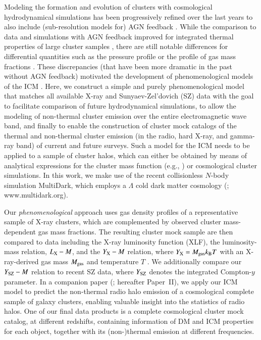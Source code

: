 \documentclass[useAMS,usenatbib]{mn2e}
\begin{document}
{  Modeling the formation and evolution of clusters with cosmological
  hydrodynamical simulations has been progressively refined over the last years
  to also include (sub-resolution models for) AGN feedback
  \citep[e.g.,][]{2007MNRAS.380..877S, 2008MNRAS.387.1403S, 2008ApJ...687L..53P,
    2012MNRAS.420.2662D, 2012MNRAS.424..190G, 2013MNRAS.428.2366V}. While the
  comparison to data and simulations with AGN feedback improved for integrated
  thermal properties of large cluster samples
  \citep{2012ApJ...758...74B,2012ApJ...758...75B}, there are still notable
  differences for differential quantities such as the pressure profile
  \citep{2013A&A...550A.131P} or the profile of gas mass fractions
  \citep{2012arXiv1209.4082B}. These discrepancies (that have been more dramatic
  in the past without AGN feedback) motivated the development of
  phenomenological models of the ICM \citep[e.g.,][]{2005ApJ...634..964O,
    2012MNRAS.422..686C}. Here, we construct a simple and purely
  phenomenological model that matches all available X-ray and Sunyaev-Zel'dovich
  (SZ) data with the goal to facilitate comparison of future hydrodynamical
  simulations, to allow the modeling of non-thermal cluster emission over the
  entire electromagnetic wave band, and finally to enable the construction of
  cluster mock catalogs of the thermal and non-thermal cluster emission (in the
  radio, hard X-ray, and gamma-ray band) of current and future surveys. Such a
  model for the ICM needs to be applied to a sample of cluster halos, which
  can either be obtained by means of analytical expressions for the cluster mass
  function (e.g., \citealp{2001MNRAS.321..372J}) or cosmological cluster
  simulations. In this work, we make use of the recent collisionless $N$-body
  simulation MultiDark, which employs a $\Lambda$ cold dark matter cosmology
  (\citealp{2011arXiv1104.5130P}; www.multidark.org).

  Our \emph{phenomenological} approach uses gas density profiles of a
  representative sample of X-ray clusters, which are complemented by observed
  cluster mass-dependent gas mass fractions. The resulting cluster mock sample
  are then compared to data including the X-ray luminosity function (XLF), the
  luminosity-mass relation, $L_{{\mathrm{X}}}- M$, and the $Y_{{\mathrm{X}}}-M$ relation,
  where $Y_{{\mathrm{X}}}=M_{\mathrm{gas}}k_{{\mathrm{B}}}T$ with an X-ray-derived gas mass
  $M_{{\mathrm{gas}}}$ and temperature $T$ \citep{2006ApJ...650..128K}. We
  additionally compare our $Y_{{\mathrm{SZ}}}-M$ relation to recent SZ data, where
  $Y_{\mathrm{SZ}}$ denotes the integrated Compton-$y$ parameter.  In a companion
  paper (\citealp{paper2}; hereafter Paper~II), we apply our ICM model to
  predict the non-thermal radio halo emission of a cosmological complete sample of
  galaxy clusters, enabling valuable insight into the statistics of radio halos.
  One of our final data products is a complete cosmological cluster mock catalog,
  at different redshifts, containing information of DM and ICM properties for
  each object, together with its (non-)thermal emission at different
  frequencies. 

}
\end{document}

